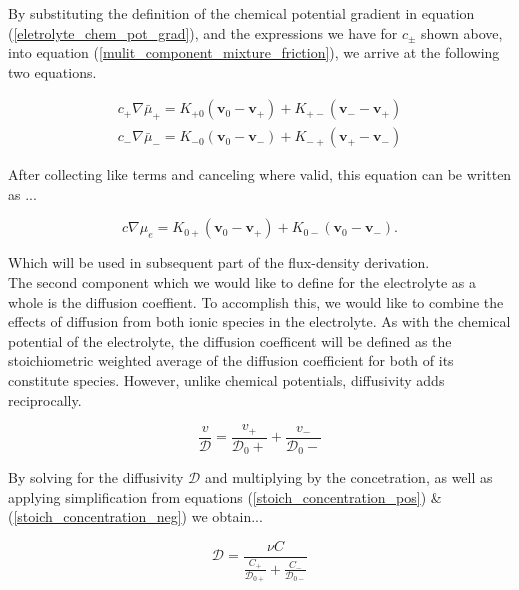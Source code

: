 \documentclass[lettersize,journal]{IEEEtran}
\begin{document}
By substituting the definition of the chemical potential gradient in equation (\ref{eletrolyte_chem_pot_grad}), and the expressions we have for $c_{\pm}$ shown above, into equation (\ref{mulit_component_mixture_friction}), we arrive at the following two equations.

\begin{equation}
\begin{array}{l}
c_{+} \nabla \bar{\mu}_{+}=K_{+0}\left(\mathbf{v}_{0}-\mathbf{v}_{+}\right)+K_{+-}\left(\mathbf{v}_{-}-\mathbf{v}_{+}\right) \\
c_{-} \nabla \bar{\mu}_{-}=K_{-0}\left(\mathbf{v}_{0}-\mathbf{v}_{-}\right)+K_{-+}\left(\mathbf{v}_{+}-\mathbf{v}_{-}\right)
\end{array}
\end{equation}

After collecting like terms and canceling where valid, this equation can be written as ...

\begin{equation}
c \nabla \mu_{e}= K_{0+}\left(\mathbf{v}_{0}-\mathbf{v}_{+}\right)+K_{0-}\left(\mathbf{v}_{0}-\mathbf{v}_{-}\right) .
\end{equation}

Which will be used in subsequent part of the flux-density derivation. \\

The second component which we would like to define for the electrolyte as a whole is the diffusion coeffient. To accomplish this, we would like to combine the effects of diffusion from both ionic species in the electrolyte. As with the chemical potential of the electrolyte, the diffusion coefficent will be defined as the stoichiometric weighted average of the diffusion coefficient for both of its constitute species. However, unlike chemical potentials, diffusivity adds reciprocally.

\begin{equation}
\frac{v}{\mathscr{D}}=\frac{v_{+}}{\mathscr{D}_{0}+}+\frac{v_{-}}{\mathscr{D}_{0}-}
\end{equation}

By solving for the diffusivity $\mathscr{D}$ and multiplying by the concetration, as well as applying simplification from equations (\ref{stoich_concentration_pos}) \& (\ref{stoich_concentration_neg}) we obtain...

\begin{equation}
\mathscr{D}=\frac{\nu C}{\frac{C_{+}}{\mathscr{D}_{0+}}+\frac{C_{-}}{\mathscr{D}_{0-}}}
\end{equation}
\end{document}
